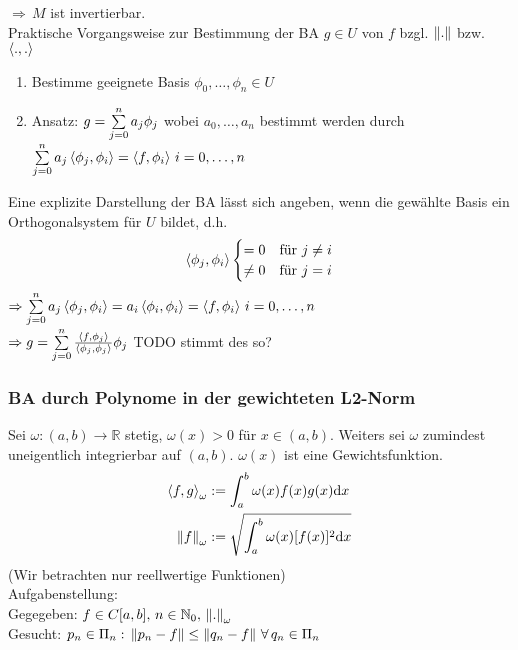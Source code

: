 $\Rightarrow\,M$ ist invertierbar.\\
Praktische Vorgangsweise zur Bestimmung der BA $g \in U$ von $f$ bzgl. $\left\lVert . \right\rVert$ bzw. $\left\langle ., . \right\rangle$
\begin{enumerate}
  \item Bestimme geeignete Basis $\phi_0,\ldots,\phi_n \in U$
  \item Ansatz: $g = \sum\limits_{j=0}^{n}{a_j\phi_j}$ wobei $a_0,\ldots,a_n$ bestimmt werden durch 
    $\sum\limits_{j=0}^{n}{a_j\left\langle \phi_j, \phi_i \right\rangle} = \left\langle f, \phi_i \right\rangle\,i=0,\ldots,n$
\end{enumerate}
Eine explizite Darstellung der BA lässt sich angeben, wenn die gewählte Basis
ein Orthogonalsystem für $U$ bildet, d.h.
\begin{align*}
  \left\langle \phi_j, \phi_i \right\rangle \begin{cases}
    = 0 &\mbox{für } j \neq i\\
    \neq 0 &\mbox{für } j = i
  \end{cases}
\end{align*}
$\Rightarrow \sum\limits_{j=0}^{n}{a_j\left\langle \phi_j, \phi_i \right\rangle} = a_i \left\langle \phi_i, \phi_i \right\rangle = \left\langle f, \phi_i \right\rangle\,i=0,\ldots,n$\\
$\Rightarrow g = \sum\limits_{j=0}^{n}{\frac{\left\langle f, \phi_j \right\rangle}{\left\langle \phi_j, \phi_j \right\rangle} \phi_j}$ TODO stimmt des so?

\subsubsection{BA durch Polynome in der gewichteten L2-Norm}
 Sei $\omega: (a,b)\longrightarrow \mathbb{R}$ stetig, $\omega(x) > 0$ für $x \in (a,b)$.
Weiters sei $\omega$ zumindest uneigentlich integrierbar auf $(a,b)$. $\omega(x)$ ist eine Gewichtsfunktion.
\begin{align*}
  \left\langle f, g \right\rangle_\omega &:= \int_a^b \omega(x) f(x)g(x) \mathrm{d}x\\
  \left\lVert f \right\rVert_\omega &:= \sqrt{\int_a^b \omega(x) [f(x)]^2 \mathrm{d}x}
\end{align*}
(Wir betrachten nur reellwertige Funktionen)\\
Aufgabenstellung:\\
Gegegeben: $f \in C[a,b],\,n \in \mathbb{N}_0,\,\left\lVert . \right\rVert_\omega$\\
Gesucht: $p_n \in \Pi_n:\,\left\lVert p_n - f \right\rVert \leq \left\lVert q_n - f \right\rVert\,\forall\, q_n \in \Pi_n$

